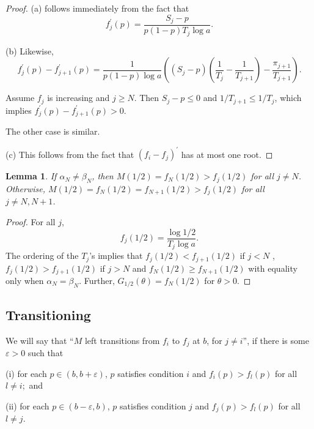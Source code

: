 \documentclass{amsart}
\newtheorem{lemma}[theorem]{Lemma}
\theoremstyle{plain}
\numberwithin{equation}{section}
\begin{document}
\begin{proof}
(a) follows immediately from the fact that 
\begin{equation*}
  f_{j}^{\prime }(p)=\frac{S_j - p}{p(1-p)T_{j}\log a}.
\end{equation*}

(b) Likewise, 
\begin{equation*}
  f_{j}^{\prime }(p)-f_{j+1}^{\prime }(p)=\frac{1}{p(1-p)\log a}\left( (S_j - p)(\frac{1}{T_{j}}-\frac{1}{T_{j+1}})-\frac{\pi_{j+1}}{T_{j+1}}\right) .
\end{equation*}

Assume $f_{j}$ is increasing and $j\geq N$. Then $S_j - p \leq 0$ and $1/T_{j+1}\leq 1/T_{j}$, 
which implies $f_{j}^{\prime }(p)-f_{j+1}^{\prime}(p)>0$.

The other case is similar.

(c) This follows from the fact that $(f_{i}-f_{j})^{\prime }$ has at most
one root.
\end{proof}

\begin{lemma}
If $\alpha _{N}\neq \beta _{N}$, then $M(1/2)=f_{N}(1/2)>f_{j}(1/2)$ for all 
$j\neq N$. Otherwise, $M(1/2)=f_{N}(1/2)=f_{N+1}(1/2)>f_{j}(1/2)$ for all $%
j\neq N,N+1$.
\end{lemma}

\begin{proof}
For all $j$, 
\begin{equation*}
f_{j}(1/2)=\frac{\log 1/2}{T_{j}\log a}.
\end{equation*}%
The ordering of the $T_{j}$'s implies that $f_{j}(1/2)<f_{j+1}(1/2)$ if $j<N$%
, $f_{j}(1/2)>f_{j+1}(1/2)$ if $j>N$ and $f_{N}(1/2)\geq f_{N+1}(1/2)$ with
equality only when $\alpha _{N}=\beta _{N}$. Further, $G_{1/2}(\theta
)=f_{N}(1/2)$ for $\theta >0$.
\end{proof}

\subsection{Transitioning}

We will say that ``$M$ left transitions from $f_{i}$ to $f_{j}$ at $b$, for $j\neq i$'', 
if there is some $\varepsilon >0$ such that

(i) for each $p\in (b,b+\varepsilon )$, $p$ satisfies condition $i$ and $f_{i}(p)>f_{l}(p)$ for all $l\neq i;$ and

(ii) for each $p\in (b-\varepsilon ,b)$, $p$ satisfies condition $j$  and $f_{j}(p)>f_{l}(p)$ for all $l\neq j$.
\end{document}
